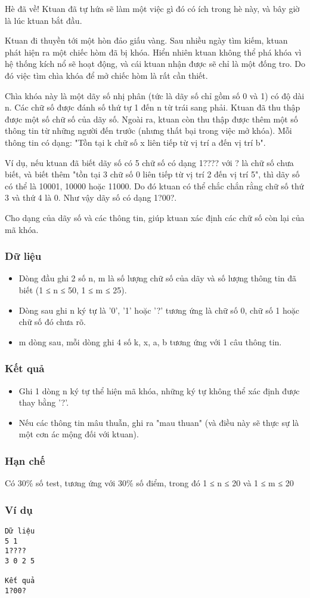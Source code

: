 

Hè đã về! Ktuan đã tự hứa sẽ làm một việc gì đó có ích trong hè này, và bây giờ là lúc ktuan bắt đầu.

Ktuan đi thuyền tới một hòn đảo giấu vàng. Sau nhiều ngày tìm kiếm, ktuan phát hiện ra một chiếc hòm đã bị khóa. Hiển nhiên ktuan không thể phá khóa vì hệ thống kích nổ sẽ hoạt động, và cái ktuan nhận được sẽ chỉ là một đống tro. Do đó việc tìm chìa khóa để mở chiếc hòm là rất cần thiết.

Chìa khóa này là một dãy số nhị phân (tức là dãy số chỉ gồm số 0 và 1) có độ dài n. Các chữ số được đánh số thứ tự 1 đến n từ trái sang phải. Ktuan đã thu thập được một số chữ số của dãy số. Ngoài ra, ktuan còn thu thập được thêm một số thông tin từ những người đến trước (nhưng thất bại trong việc mở khóa). Mỗi thông tin có dạng: "Tồn tại k chữ số x liên tiếp từ vị trí a đến vị trí b".

Ví dụ, nếu ktuan đã biết dãy số có 5 chữ số có dạng 1???? với ? là chữ số chưa biết, và biết thêm "tồn tại 3 chữ số 0 liên tiếp từ vị trí 2 đến vị trí 5", thì dãy số có thể là 10001, 10000 hoặc 11000. Do đó ktuan có thể chắc chắn rằng chữ số thứ 3 và thứ 4 là 0. Như vậy dãy số có dạng 1?00?.

Cho dạng của dãy số và các thông tin, giúp ktuan xác định các chữ số còn lại của mã khóa.

\subsubsection{Dữ liệu}
\begin{itemize}
	\item Dòng đầu ghi 2 số n, m là số lượng chữ số của dãy và số lượng thông tin đã biết (1 ≤ n ≤ 50, 1 ≤ m ≤ 25).
	\item Dòng sau ghi n ký tự là '0', '1' hoặc '?' tương ứng là chữ số 0, chữ số 1 hoặc chữ số đó chưa rõ.
	\item m dòng sau, mỗi dòng ghi 4 số k, x, a, b tương ứng với 1 câu thông tin.
\end{itemize}

\subsubsection{Kết quả}
\begin{itemize}
	\item Ghi 1 dòng n ký tự thể hiện mã khóa, những ký tự không thể xác định được thay bằng '?'.
	\item Nếu các thông tin mâu thuẫn, ghi ra "mau thuan" (và điều này sẽ thực sự là một cơn ác mộng đối với ktuan).
\end{itemize}

\subsubsection{Hạn chế}

Có 30\% số test, tương ứng với 30\% số điểm, trong đó 1 ≤ n ≤ 20 và 1 ≤ m ≤ 20

\subsubsection{Ví dụ}
\begin{verbatim}
Dữ liệu
5 1
1????
3 0 2 5

Kết quả
1?00?
\end{verbatim}